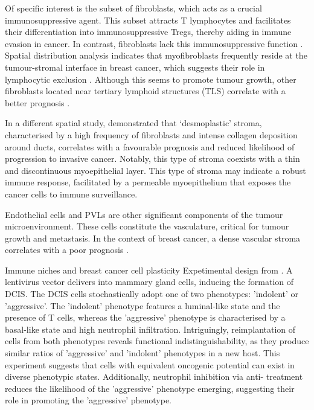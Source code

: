 Of specific interest is the   subset of fibroblasts, which acts as a crucial immunosuppressive agent. This subset attracts T lymphocytes and facilitates their differentiation into immunosuppressive Tregs, thereby aiding in immune evasion in cancer. In contrast,   fibroblasts lack this immunosuppressive function \parencite{Costa2018-ir}. Spatial distribution analysis indicates that myofibroblasts frequently reside at the tumour-stromal interface in breast cancer, which suggests their role in lymphocytic exclusion \parencite{Danenberg2022-zb}. Although this seems to promote tumour growth, other fibroblasts located near tertiary lymphoid structures (TLS) correlate with a better prognosis \parencite{Danenberg2022-zb, Cords2023-og} . 

In a different spatial study, \textcite{Risom2022-uw} demonstrated that `desmoplastic' stroma, characterised by a high frequency of fibroblasts and intense collagen deposition around ducts, correlates with a favourable prognosis and reduced likelihood of progression to invasive cancer. Notably, this type of stroma coexists with a thin and discontinuous myoepithelial layer. This type of stroma may indicate a robust immune response, facilitated by a permeable myoepithelium that exposes the cancer cells to immune surveillance.

Endothelial cells and \acp{PVL} are other significant components of the tumour microenvironment. These cells constitute the vasculature, critical for tumour growth and metastasis. In the context of breast cancer, a dense vascular stroma correlates with a poor prognosis \parencite{Danenberg2022-zb}.

    {Immune niches and breast cancer cell plasticity}
    {Expetimental design from \textcite{Sinha2021-mf}. A lentivirus vector delivers  into mammary gland cells, inducing the formation of \acf{DCIS}. The \ac{DCIS} cells stochastically adopt one of two phenotypes: 'indolent' or 'aggressive'. The 'indolent' phenotype features a luminal-like state and the presence of T cells, whereas the 'aggressive' phenotype is characterised by a basal-like state and high neutrophil infiltration. Intriguingly, reimplantation of cells from both phenotypes reveals functional indistinguishability, as they produce similar ratios of 'aggressive' and 'indolent' phenotypes in a new host. This experiment suggests that cells with equivalent oncogenic potential can exist in diverse phenotypic states. Additionally, neutrophil inhibition via anti- treatment reduces the likelihood of the 'aggressive' phenotype emerging, suggesting their role in promoting the 'aggressive' phenotype.}


